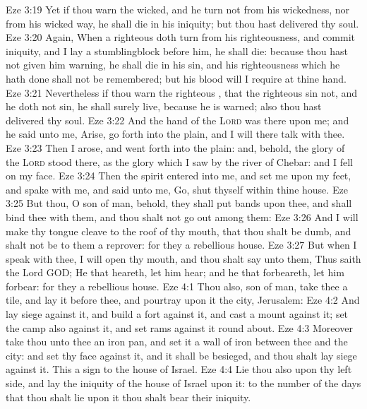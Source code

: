 \vs Eze 3:19 Yet if thou warn the wicked, and he turn not from his wickedness, nor from his wicked way, he shall die in his iniquity; but thou hast delivered thy soul.
\vs Eze 3:20 Again, When a righteous  doth turn from his righteousness, and commit iniquity, and I lay a stumblingblock before him, he shall die: because thou hast not given him warning, he shall die in his sin, and his righteousness which he hath done shall not be remembered; but his blood will I require at thine hand.
\vs Eze 3:21 Nevertheless if thou warn the righteous , that the righteous sin not, and he doth not sin, he shall surely live, because he is warned; also thou hast delivered thy soul.
\vs Eze 3:22 And the hand of the \textsc{Lord} was there upon me; and he said unto me, Arise, go forth into the plain, and I will there talk with thee.
\vs Eze 3:23 Then I arose, and went forth into the plain: and, behold, the glory of the \textsc{Lord} stood there, as the glory which I saw by the river of Chebar: and I fell on my face.
\vs Eze 3:24 Then the spirit entered into me, and set me upon my feet, and spake with me, and said unto me, Go, shut thyself within thine house.
\vs Eze 3:25 But thou, O son of man, behold, they shall put bands upon thee, and shall bind thee with them, and thou shalt not go out among them:
\vs Eze 3:26 And I will make thy tongue cleave to the roof of thy mouth, that thou shalt be dumb, and shalt not be to them a reprover: for they  a rebellious house.
\vs Eze 3:27 But when I speak with thee, I will open thy mouth, and thou shalt say unto them, Thus saith the Lord GOD; He that heareth, let him hear; and he that forbeareth, let him forbear: for they  a rebellious house.
\vs Eze 4:1 Thou also, son of man, take thee a tile, and lay it before thee, and pourtray upon it the city,  Jerusalem:
\vs Eze 4:2 And lay siege against it, and build a fort against it, and cast a mount against it; set the camp also against it, and set  rams against it round about.
\vs Eze 4:3 Moreover take thou unto thee an iron pan, and set it  a wall of iron between thee and the city: and set thy face against it, and it shall be besieged, and thou shalt lay siege against it. This  a sign to the house of Israel.
\vs Eze 4:4 Lie thou also upon thy left side, and lay the iniquity of the house of Israel upon it:  to the number of the days that thou shalt lie upon it thou shalt bear their iniquity.
